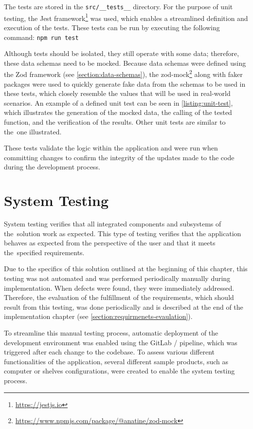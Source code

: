 The tests are stored in the \texttt{src/\_\_tests\_\_} directory. For the purpose of unit testing, the Jest framework\footnote{\url{https://jestjs.io}} was used, which enables a streamlined definition and execution of the tests. These tests can be run by executing the following command: \texttt{npm run test}

Although tests should be isolated, they still operate with some data; therefore, these data schemas need to be mocked. Because data schemas were defined using the Zod framework (see \autoref{section:data-schemas}), the zod-mock\footnote{\url{https://www.npmjs.com/package/@anatine/zod-mock}} along with faker packages were used to quickly generate fake data from the schemas to be used in these tests, which closely resemble the values that will be used in real-world scenarios. An example of a defined unit test can be seen in \autoref{listing:unit-test}, which illustrates the generation of the mocked data, the calling of the tested function, and the verification of the results. Other unit tests are similar to the~one illustrated.

These tests validate the logic within the application and were run when committing changes to confirm the integrity of the updates made to the code during the development process.


\section{System Testing}

System testing verifies that all integrated components and subsystems of the~solution work as expected. This type of testing verifies that the application behaves as expected from the perspective of the user and that it meets the~specified requirements.~\cite{Stephens2023}

Due to the specifics of this solution outlined at the beginning of this chapter, this testing was not automated and was performed periodically manually during implementation. When defects were found, they were immediately addressed. Therefore, the evaluation of the fulfillment of the requirements, which should result from this testing, was done periodically and is described at the end of the implementation chapter (see \autoref{section:requirmenets-evaulation}).

To streamline this manual testing process, automatic deployment of the development environment was enabled using the GitLab / pipeline, which was triggered after each change to the codebase. To assess various different functionalities of the application, several different sample products, such as computer or shelves configurations, were created to enable the system testing process. 

